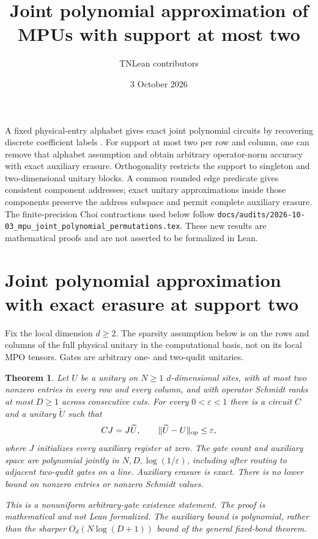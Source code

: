 \documentclass[11pt]{article}
\title{Joint polynomial approximation of MPUs with support at most two}
\author{TNLean contributors}
\date{3 October 2026}
\newtheorem{theorem}{Theorem}
\begin{document}
\maketitle

A fixed physical-entry alphabet gives exact joint polynomial
circuits by recovering discrete coefficient labels
\cite{fixed-alphabet}. For support
at most two per row and column, one can remove that alphabet
assumption and obtain arbitrary operator-norm accuracy with
exact auxiliary erasure. Orthogonality restricts the support to
singleton and two-dimensional unitary blocks. A common rounded
edge predicate gives consistent component addresses; exact
unitary approximations inside those components preserve the
address subspace and permit complete auxiliary erasure.
The finite-precision Choi contractions used below follow
\nolinkurl{docs/audits/2026-10-03_mpu_joint_polynomial_permutations.tex}.
These new results are mathematical proofs and are not asserted
to be formalized in Lean.

\section{Joint polynomial approximation with exact erasure at support two}

Fix the local dimension $d\ge2$.
The sparsity assumption below is on the rows and columns of the
full physical unitary in the computational basis, not on its
local MPO tensors.
Gates are arbitrary one- and two-qudit unitaries.

\begin{theorem}
Let $U$ be a unitary on $N\ge1$ $d$-dimensional sites, with at
most two nonzero entries in every row and every column, and with
operator Schmidt ranks at most $D\ge1$ across consecutive cuts.
For every $0<\varepsilon<1$ there is a circuit $C$ and a unitary
$\widetilde U$ such that
\[
 CJ=J\widetilde U,\qquad
 \|\widetilde U-U\|_{\rm op}\le\varepsilon,
\]
where $J$ initializes every auxiliary register at zero.
The gate count and auxiliary space are polynomial jointly in
$N,D,\log(1/\varepsilon)$, including after routing to adjacent
two-qudit gates on a line. Auxiliary erasure is exact.
There is no lower bound on nonzero entries or nonzero Schmidt
values.

This is a nonuniform arbitrary-gate existence statement.
The proof is mathematical and not Lean formalized.
The auxiliary bound is polynomial, rather than the sharper
$O_d(N\log(D+1))$ bound of the general fixed-bond theorem.
\end{theorem}
\end{document}
